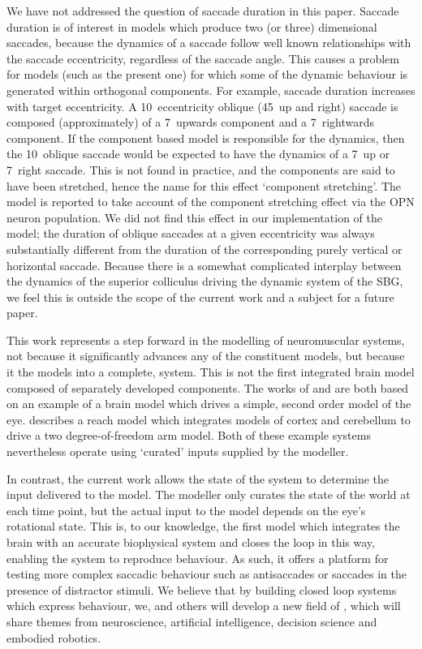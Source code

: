 \documentclass{frontiersSCNS}
\begin{document}
We have not addressed the question of saccade duration in this paper.
Saccade duration is of interest in models which produce two (or three)
dimensional saccades, because the dynamics of a saccade follow well
known relationships with the saccade eccentricity, regardless of the
saccade angle. This causes a problem for models (such as the present
one) for which some of the dynamic behaviour is generated within
orthogonal components.  For example, saccade duration increases with
target eccentricity. A 10\dg~eccentricity oblique (45\dg~up and right)
saccade is composed (approximately) of a 7\dg~upwards component and a
7\dg~rightwards component. If the component based model is responsible
for the dynamics, then the 10\dg~oblique saccade would be expected to
have the dynamics of a 7\dg~up or 7\dg~right saccade. This is not
found in practice, and the components are said to have been stretched,
hence the name for this effect `component
stretching'. The \cite{gancarz_neural_1998} model is reported to take
account of the component stretching effect via the OPN neuron
population. We did not find this effect in our implementation of the
model; the duration of oblique saccades at a given eccentricity was
always substantially different from the duration of the corresponding
purely vertical or horizontal saccade. Because there is a somewhat
complicated interplay between the dynamics of the superior colliculus
driving the dynamic system of the SBG, we feel this is outside the
scope of the current work and a subject for a future paper.

This work represents a step forward in the modelling of neuromuscular
systems, not because it significantly advances any of the constituent
models, but because it  the models into a
complete,  system.  This is not the first integrated brain
model composed of separately developed components. The works
of \cite{nguyen_saccade_2014} and
\cite{thurat_biomimetic_2015} are both based
on an example of a brain model which drives a simple, second order
model of the eye. \cite{dewolf_spiking_2016} describes a reach model
which integrates models of cortex and cerebellum to drive a two
degree-of-freedom arm model. Both of these example systems
nevertheless operate using `curated' inputs supplied by the modeller.

In contrast, the current work allows the state of the system to
determine the input delivered to the model. The modeller only curates
the state of the world at each time point, but the actual input to the
model depends on the eye's rotational state.  This is, to our
knowledge, the first model which integrates the brain with an accurate
biophysical system and closes the loop in this way, enabling the
system to reproduce behaviour.  As such, it offers a platform for
testing more complex saccadic behaviour such as antisaccades or
saccades in the presence of distractor stimuli. We believe that by
building closed loop systems which express behaviour, we, and others
will develop a new field of , which
will share themes from neuroscience, artificial intelligence, decision
science and embodied robotics.
\end{document}
